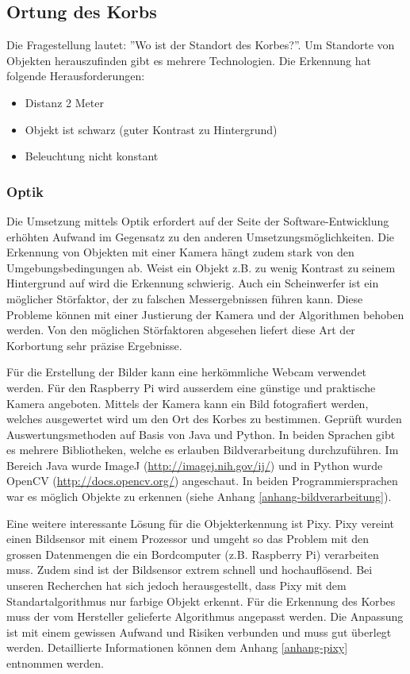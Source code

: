 \subsection{Ortung des Korbs}
Die Fragestellung lautet: ''Wo ist der Standort des Korbes?''. Um Standorte von Objekten herauszufinden gibt es mehrere Technologien. Die Erkennung hat folgende Herausforderungen:
\begin{itemize}
	\item Distanz 2 Meter
	\item Objekt ist schwarz (guter Kontrast zu Hintergrund)
	\item Beleuchtung nicht konstant
\end{itemize}

\subsubsection{Optik}
Die Umsetzung mittels Optik erfordert auf der Seite der Software-Entwicklung erhöhten Aufwand im Gegensatz zu den anderen Umsetzungsmöglichkeiten. Die Erkennung von Objekten mit einer Kamera hängt zudem stark von den Umgebungsbedingungen ab. Weist ein Objekt z.B. zu wenig Kontrast zu seinem Hintergrund auf wird die Erkennung schwierig. Auch ein Scheinwerfer ist ein möglicher Störfaktor, der zu falschen Messergebnissen führen kann. Diese Probleme können mit einer Justierung der Kamera und der Algorithmen behoben werden. Von den möglichen Störfaktoren abgesehen liefert diese Art der Korbortung sehr präzise Ergebnisse.

Für die Erstellung der Bilder kann eine herkömmliche Webcam verwendet werden. Für den Raspberry Pi wird ausserdem eine günstige und praktische Kamera angeboten. Mittels der Kamera kann ein Bild fotografiert werden, welches ausgewertet wird um den Ort des Korbes zu bestimmen. Geprüft wurden Auswertungsmethoden auf Basis von Java und Python. In beiden Sprachen gibt es mehrere Bibliotheken, welche es erlauben Bildverarbeitung durchzuführen. Im Bereich Java wurde ImageJ (\href{http://imagej.nih.gov/ij/}{http://imagej.nih.gov/ij/}) und in Python wurde OpenCV (\href{http://docs.opencv.org/}{http://docs.opencv.org/}) angeschaut. In beiden Programmiersprachen war es möglich Objekte zu erkennen (siehe Anhang \ref{anhang-bildverarbeitung}).

Eine weitere interessante Lösung für die Objekterkennung ist Pixy. Pixy vereint einen Bildsensor mit einem Prozessor und umgeht so das Problem mit den grossen Datenmengen die ein Bordcomputer (z.B. Raspberry Pi) verarbeiten muss. Zudem sind ist der Bildsensor extrem schnell und hochauflösend. Bei unseren Recherchen hat sich jedoch herausgestellt, dass Pixy mit dem Standartalgorithmus nur farbige Objekt erkennt. Für die Erkennung des Korbes muss der vom Hersteller gelieferte Algorithmus angepasst werden. Die Anpassung ist mit einem gewissen Aufwand und Risiken verbunden und muss gut überlegt werden. Detaillierte Informationen können dem Anhang \ref{anhang-pixy} entnommen werden.

